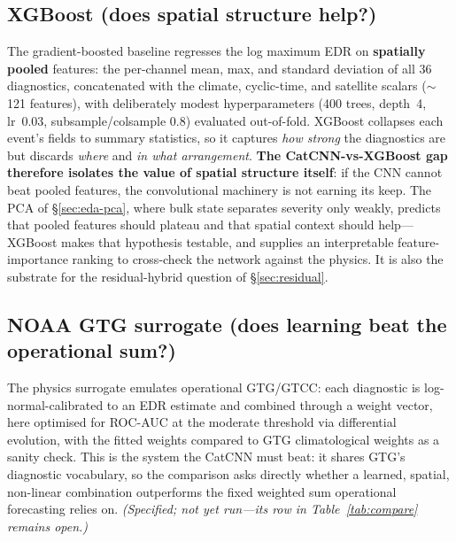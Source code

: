 \documentclass[11pt]{article}
\begin{document}
\subsection{XGBoost (does spatial structure help?)}
\label{sec:eval-xgb}
The gradient-boosted baseline regresses the log maximum EDR on
\textbf{spatially pooled} features: the per-channel mean, max, and
standard deviation of all 36 diagnostics, concatenated with the climate,
cyclic-time, and satellite scalars ($\sim$121 features), with deliberately
modest hyperparameters (400 trees, depth~4, lr~0.03, subsample/colsample
0.8) evaluated out-of-fold. XGBoost collapses each event's fields to
summary statistics, so it captures \emph{how strong} the diagnostics are
but discards \emph{where} and \emph{in what arrangement}. \textbf{The
CatCNN-vs-XGBoost gap therefore isolates the value of spatial structure
itself}: if the CNN cannot beat pooled features, the convolutional
machinery is not earning its keep. The PCA of \S\ref{sec:eda-pca}, where
bulk state separates severity only weakly, predicts that pooled features
should plateau and that spatial context should help---XGBoost makes that
hypothesis testable, and supplies an interpretable feature-importance
ranking to cross-check the network against the physics. It is also the
substrate for the residual-hybrid question of \S\ref{sec:residual}.

\subsection{NOAA GTG surrogate (does learning beat the operational sum?)}
\label{sec:eval-gtg}
The physics surrogate emulates operational GTG/GTCC: each diagnostic is
log-normal-calibrated to an EDR estimate and combined through a weight
vector, here optimised for ROC-AUC at the moderate threshold via
differential evolution, with the fitted weights compared to GTG
climatological weights as a sanity check. This is the system the CatCNN
must beat: it shares GTG's diagnostic vocabulary, so the comparison
asks directly whether a learned, spatial, non-linear combination
outperforms the fixed weighted sum operational forecasting relies on.
\emph{(Specified; not yet run---its row in Table~\ref{tab:compare}
remains open.)}
\end{document}
